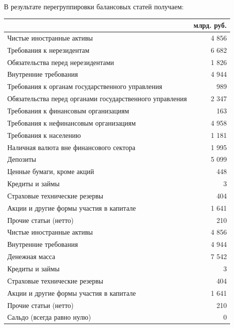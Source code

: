 \documentclass[12pt, table, a4paper,twoside]{exam}
\begin{document}
\begin{questions}
\vfill\null\pagebreak
\begin{solution}[12em] В результате перегруппировки балансовых статей получаем:
	
	\begin{tabularx}{\linewidth}[b]{@{}>{\raggedright\arraybackslash}Xr@{}}				& млрд. руб.\\
		\toprule
		Чистые иностранные активы &            4 856    \\
		\midrule
		Требования к нерезидентам &            6 682    \\
		Обязательства перед нерезидентами &            1 826    \\
		\midrule
		Внутренние требования &            4 944    \\
		Требования к органам государственного управления &                989    \\
		Обязательства перед органами государственного управления &            2 347    \\
		Требования к финансовым организациям &                163    \\
		Требования к нефинансовым организациям &            4 958    \\
		Требования к населению &            1 181    \\
		\midrule
		Наличная валюта вне финансового сектора &            1 995    \\
		Депозиты &            5 099    \\
		Ценные бумаги, кроме акций &                448    \\
		\midrule
		Кредиты и займы &                    3    \\
		Страховые технические резервы &                404    \\
		Акции и другие формы участия в капитале &            1 641    \\
		Прочие статьи (нетто) &                210    \\
		\midrule
		Чистые иностранные активы &            4 856    \\
		Внутренние требования &            4 944    \\
		Денежная масса &            7 542    \\
		Кредиты и займы &                    3    \\
		Страховые технические резервы &                404    \\
		Акции и другие формы участия в капитале &            1 641    \\
		Прочие статьи (нетто) &                210    \\
		\midrule
		Сальдо (всегда равно нулю) &                    0    \\
		\bottomrule
	\end{tabularx}%
\end{solution}


\end{questions}
\end{document}
